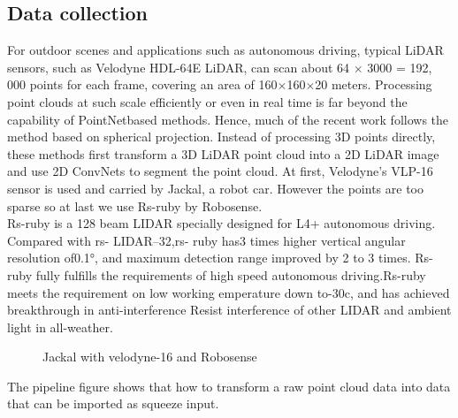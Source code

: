 \documentclass[final]{cvpr}
\begin{document}
\subsection{Data collection}
For outdoor scenes and applications such as autonomous driving, typical LiDAR sensors, such as Velodyne HDL-64E LiDAR, can scan about 64 × 3000 = 192, 000 points for each frame, covering an area of 160×160×20 meters. Processing point clouds at such scale efficiently or even in real time is far beyond the capability of PointNetbased methods. Hence, much of the recent work follows the method
based on spherical projection. Instead of processing 3D points directly, these methods first transform a 3D LiDAR point cloud into a 2D LiDAR image and use 2D ConvNets to segment the point cloud. At first, Velodyne’s VLP-16 sensor is used and carried by Jackal, a robot car. However the points are too sparse so at last we use Rs-ruby by Robosense.\\
Rs-ruby is a 128 beam LIDAR specially designed for L4+ autonomous driving. Compared with rs- LIDAR--32,rs- ruby has3 times higher vertical angular resolution of0.1°, and maximum detection range improved by 2 to 3 times. Rs-ruby fully fulfills the requirements of high speed autonomous driving.Rs-ruby meets the requirement on low working emperature down to-30c, and has achieved breakthrough in anti-interference Resist interference of other LIDAR and ambient light in
all-weather.
\begin{figure}[p]
\centering
{}%
%
\centering
\caption{Jackal with velodyne-16 and Robosense}
\end{figure}
The pipeline figure shows that how to transform a raw point cloud data into data that can be imported as squeeze input.
\end{document}
